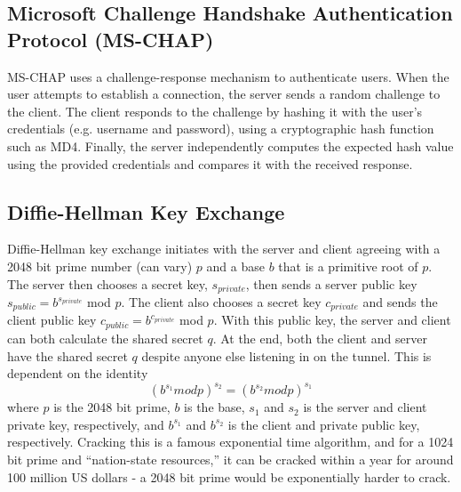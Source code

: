 \documentclass[runningheads]{llncs}
\begin{document}
\subsection{Microsoft Challenge Handshake Authentication Protocol (MS-CHAP)}
MS-CHAP uses a challenge-response mechanism to authenticate users. \cite{ms-chap} When the user attempts to establish a connection, the server sends a random challenge to the client. The client responds to the challenge by hashing it with the user’s credentials (e.g. username and password), using a cryptographic hash function such as MD4. Finally, the server independently computes the expected hash value using the provided credentials and compares it with the received response.
\subsection{Diffie-Hellman Key Exchange}
Diffie-Hellman key exchange initiates with the server and client agreeing with a 2048 bit prime number (can vary) $p$ and a base $b$ that is a primitive root of $p$. The server then chooses a secret key, $s_{private}$, then sends a server public key $s_{public} = b^{s_{private}}$ mod $p$. The client also chooses a secret key $c_{private}$ and sends the client public key $c_{public} = b^{c_{private}}$ mod $p$. With this public key, the server and client can both calculate the shared secret $q$. At the end, both the client and server have the shared secret $q$ despite anyone else listening in on the tunnel. This is dependent on the identity
\begin{equation}
(b^{s_1} mod p)^{s_2} = (b^{s_2} mod p)^{s_1}
\end{equation}
where $p$ is the 2048 bit prime, $b$ is the base, $s_1$ and $s_2$ is the server and client private key,  respectively, and $b^{s_1}$ and $b^{s_2}$ is the client and private public key, respectively. Cracking this is a famous exponential time algorithm, and for a 1024 bit prime and “nation-state resources,” it can be cracked within a year for around 100 million US dollars - a 2048 bit prime would be exponentially harder to crack. \cite{imperfect_fs}
\end{document}
